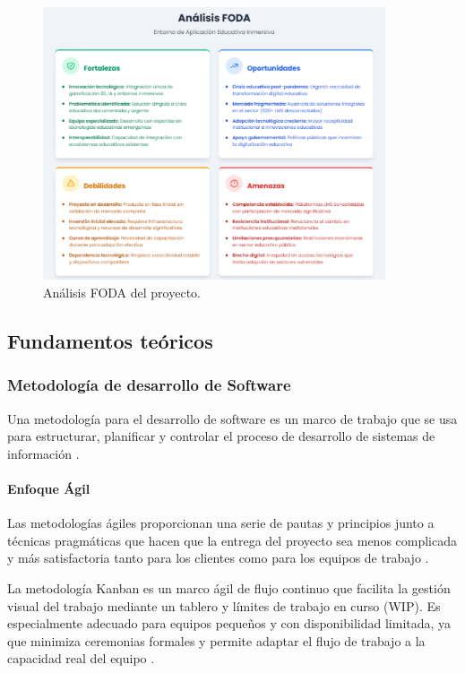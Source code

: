 \begin{figure}[H]
	\centering
	\includegraphics[width=0.9\textwidth]{images/analisis_foda.png}
	\caption{Análisis FODA del proyecto.}
	\label{fig:foda}
\end{figure}

\subsection{Fundamentos teóricos}

\subsubsection{Metodología de desarrollo de Software}

Una metodología para el desarrollo de software es un marco de trabajo que se usa para estructurar, planificar y controlar el proceso de desarrollo de sistemas de información \cite{velneo2023}.

\paragraph{Enfoque Ágil}
Las metodologías ágiles proporcionan una serie de pautas y principios junto a técnicas pragmáticas que hacen que la entrega del proyecto sea menos complicada y más satisfactoria tanto para los clientes como para los equipos de trabajo \cite{mayda2015}.

La metodología Kanban es un marco ágil de flujo continuo que facilita la gestión visual del trabajo mediante un tablero y límites de trabajo en curso (WIP). Es especialmente adecuado para equipos pequeños y con disponibilidad limitada, ya que minimiza ceremonias formales y permite adaptar el flujo de trabajo a la capacidad real del equipo \cite{anderson2010}.

